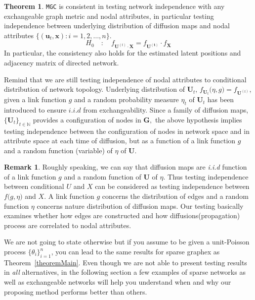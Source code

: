 \documentclass[12pt]{article}
\theoremstyle{definition}
\newtheorem{theorem}{Theorem}[section]
\newtheorem{remark}{Remark}
\begin{document}
\begin{theorem}
	\label{theorem2}
	\texttt{MGC} is consistent in testing network independence with any exchangeable graph metric and nodal attributes, in particular testing independence between underlying distribution of diffusion maps and nodal attributes $\{ ( \mathbf{u}_{t},  \mathbf{x}  ) : i =1,2, \ldots , n \}$.
	\begin{equation}
	H_{0}  \quad : \quad f_{\mathbf{U}^{(t)} \cdot \mathbf{X}  }  = f_{\mathbf{U^{(t)}}} \cdot f_{\mathbf{X}}
	\label{eq:hypothesis}
	\end{equation}
	 In particular, the consistency also holds for the estimated latent positions and adjacency matrix of directed network.
\end{theorem}
		
Remind that we are still testing independence of nodal attributes to conditional distribution of network topology. Underlying distribution of $\mathbf{U}_{t}$, $f_{\mathbf{U}_t} \big( \eta, g \big) = f_{\mathbf{U}^{(t)} }$, given a link function $g$ and a random probability measure $\eta_{t}$ of $\mathbf{U}_t$ has been introduced to ensure $\textit{i.i.d}$ from exchangeability. Since a family of diffusion maps, $\{ \boldsymbol{U}_{t} \}_{t \in \mathbb{N}}$ provides a configuration of nodes in $\mathbf{G},$ the above hypothesis implies testing independence between the configuration of nodes in network space and in attribute space at each time of diffusion, but as a function of a link function $g$ and a random function (variable) of $\eta$ of $\mathbf{U}$.	
\begin{remark}
	Roughly speaking, we can say that diffusion maps are \textit{i.i.d} function of a link function $g$ and a random function of $\mathbf{U}$ of $\eta$. Thus testing independence between conditional $U$ and $X$ can be considered as testing independence between $f \big( g, \eta \big)$ and $X$. A link function $g$ concerns the distribution of edges and a random function $\eta$ concerns nature distribution of diffusion maps. Our testing basically examines whether how edges are constructed and how diffusions(propagation) process are correlated to nodal attributes.  
\end{remark}

We are not going to state otherwise but if you assume to be given a unit-Poisson process $\{ \theta_{i} \}_{i=1}^{n}$, you can lead to the same results for sparse graphex as Theorem~\ref{theoremMain}. Even though we are not able to present testing results in \textit{all} alternatives, in the following section a few examples of sparse networks as well as exchangeable networks will help you understand when and why our proposing method performs better than others. 
\end{document}
